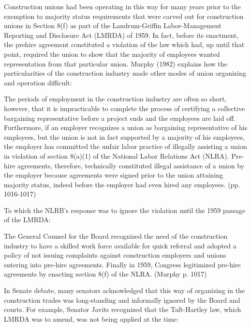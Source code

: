 \documentclass[12pt]{article}
\renewenvironment{quote}
  {\list{}{\leftmargin=\parindent\rightmargin=0pt}%
   \item\relax}
  {\endlist}
\begin{document}
Construction unions had been operating in this way for many years prior to the exemption to majority status requirements that were carved out for construction unions in Section 8(f) as part of the Landrum-Griffin Labor-Management Reporting and Disclosure Act (LMRDA) of 1959. In fact, before its enactment, the prehire agreement constituted a violation of the law which had, up until that point, required the union to show that the majority of employees wanted representation from that particular union. Murphy (1982) explains how the particularities of the construction industry made other modes of union organizing and operation difficult:

\begin{quote}
	The periods of employment in the construction industry are often so short, however, that it is impracticable to complete the process of certifying a collective bargaining representative before a project ends and the employees are laid off. Furthermore, if an employer recognizes a union as bargaining representative of his employees, but the union is not in fact supported by a majority of his employees, the employer has committed the unfair labor practice of illegally assisting a union in violation of section 8(a)(1) of the National Labor Relations Act (NLRA). Pre-hire agreements, therefore, technically constituted illegal assistance of a union by the employer because agreements were signed prior to the union attaining majority status, indeed before the employer had even hired any employees. (pp. 1016-1017)
\end{quote}

To which the NLRB’s response was to ignore the violation until the 1959 passage of the LMRDA:

\begin{quote}
	The General Counsel for the Board recognized the need of the construction industry to have a skilled work force available for quick referral and adopted a policy of not issuing complaints against construction employers and unions entering into pre-hire agreements. Finally in 1959, Congress legitimized pre-hire agreements by enacting section 8(f) of the NLRA. (Murphy p. 1017)
\end{quote}

In Senate debate, many senators acknowledged that this way of organizing in the construction trades was long-standing and informally ignored by the Board and courts. For example, Senator Javits recognized that the Taft-Hartley law, which LMRDA was to amend, was not being applied at the time:
\end{document}
